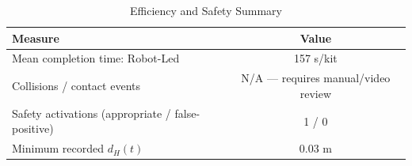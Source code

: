 \begin{table}[t]
\caption{Efficiency and Safety Summary}
\label{tab:xvii}
\centering
\begin{tabular}{lc}
\toprule
Measure & Value \\
\midrule
Mean completion time: Robot-Led & 157 s/kit \\
Collisions / contact events & N/A --- requires manual/video review \\
Safety activations (appropriate / false-positive) & 1 / 0 \\
Minimum recorded $d_H(t)$ & 0.03 m \\
\bottomrule
\end{tabular}
\end{table}
